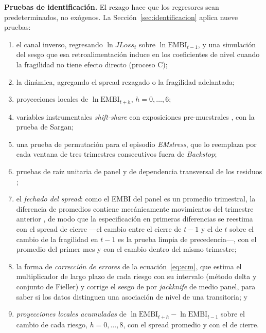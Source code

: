 \textbf{Pruebas de identificación.} El rezago hace que los regresores sean predeterminados, no exógenos. La Sección~\ref{sec:identificacion} aplica nueve pruebas:
\begin{enumerate}\renewcommand{\labelenumi}{(\roman{enumi})}
    \item el canal inverso, regresando $\ln JLoss_t$ sobre $\ln\mathrm{EMBI}_{t-1}$, y una simulación del sesgo que esa retroalimentación induce en los coeficientes de nivel cuando la fragilidad no tiene efecto directo (proceso C);
    \item la dinámica, agregando el spread rezagado o la fragilidad adelantada;
    \item proyecciones locales \citep{Jorda2005} de $\ln\mathrm{EMBI}_{t+h}$, $h=0,\dots,6$;
    \item variables instrumentales \textit{shift-share} con exposiciones pre-muestrales \citep{GoldsmithPinkhamSorkinSwift2020}, con la prueba de Sargan;
    \item una prueba de permutación para el episodio \textit{EMstress}, que lo reemplaza por cada ventana de tres trimestres consecutivos fuera de \textit{Backstop};
    \item pruebas de raíz unitaria de panel \citep{MaddalaWu1999} y de dependencia transversal de los residuos \citep{Pesaran2004};
    \item el \emph{fechado del spread}: como el EMBI del panel es un promedio trimestral, la diferencia de promedios contiene mecánicamente movimientos del trimestre anterior \citep{Working1960}, de modo que la especificación en primeras diferencias se reestima con el spread de cierre ---el cambio entre el cierre de $t-1$ y el de $t$ sobre el cambio de la fragilidad en $t-1$ es la prueba limpia de precedencia---, con el promedio del primer mes y con el cambio dentro del mismo trimestre;
    \item la forma de \emph{corrección de errores} de la ecuación~\eqref{eq:ecm}, que estima el multiplicador de largo plazo de cada riesgo con su intervalo (método delta y conjunto de Fieller) y corrige el sesgo de \citet{Nickell1981} por \textit{jackknife} de medio panel, para saber si los datos distinguen una asociación de nivel de una transitoria; y
    \item \emph{proyecciones locales acumuladas} de $\ln\mathrm{EMBI}_{t+h}-\ln\mathrm{EMBI}_{t-1}$ sobre el cambio de cada riesgo, $h=0,\dots,8$, con el spread promedio y con el de cierre.
\end{enumerate}

